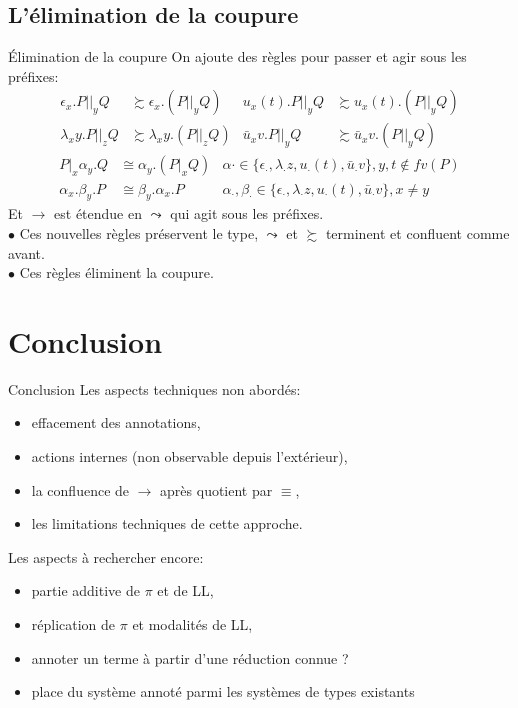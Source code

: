 \documentclass[11pt]{beamer}
\begin{document}
\subsection{L'élimination de la coupure}

\begin{frame}{Élimination de la coupure}
On ajoute des règles pour passer et agir sous les préfixes:
\begin{align*}
\epsilon_x.P||_yQ &\succsim \epsilon_x.(P||_yQ) & u_x(t).P||_yQ &\succsim u_x(t).(P||_yQ)\\
\lambda_xy.P||_zQ &\succsim \lambda_xy.(P||_zQ) & \bar{u}_xv.P||_yQ &\succsim \bar{u}_xv.(P||_yQ)
\end{align*}
\begin{align*}
P|_x \alpha_y.Q &\cong \alpha_y.(P|_xQ) & \alpha\cdot \in \{\epsilon_\cdot,\lambda_\cdot z,u_\cdot(t),\bar{u}_\cdot v\}, y,t\not\in fv(P)\\
\alpha_x.\beta_y.P &\cong \beta_y.\alpha_x.P & \alpha_\cdot,\beta_\cdot \in \{\epsilon_\cdot,\lambda_\cdot z,u_\cdot(t),\bar{u}_\cdot v\},x\neq y
\end{align*}
Et $\to$ est étendue en $\leadsto$ qui agit sous les préfixes.\\
\pause$\bullet$ Ces nouvelles règles préservent le type, $\leadsto$ et $\succsim$ terminent et confluent comme avant.\\
\pause$\bullet$ Ces règles éliminent la coupure.
\end{frame}

\section{Conclusion}

\begin{frame}{Conclusion}
Les aspects techniques non abordés:
\begin{itemize}
\item effacement des annotations,
\item actions internes (non observable depuis l'extérieur),
\item la confluence de $\to$ après quotient par $\equiv$,
\item les limitations techniques de cette approche.
\end{itemize}
Les aspects à rechercher encore:
\begin{itemize}
\item partie additive de $\pi$ et de LL,
\item réplication de $\pi$ et modalités de LL,
\item annoter un terme à partir d'une réduction connue ?
\item place du système annoté parmi les systèmes de types existants
\end{itemize}
\end{frame}
\end{document}
